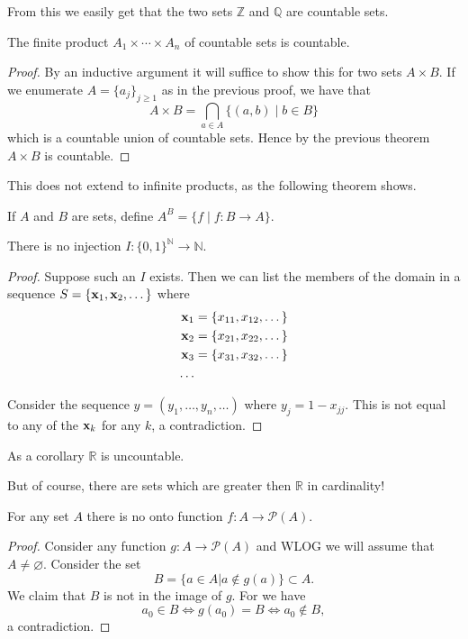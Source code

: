 From this we easily get that the two sets $\mathbb{Z}$ and $\mathbb{Q}$ are countable sets.

\begin{theorem}
The finite product $A_1 \times \cdots \times A_n$ of countable sets is countable.
\end{theorem}

\begin{proof}
By an inductive argument it will suffice to show this for two sets $A \times B$. If we enumerate $A = \{a_j\}_{j \geq 1}$ as in the previous proof, we have that 
\[A \times B = \bigcap_{a \in A}\{(a, b) \mid b \in B\}\] which is a countable union of countable sets. Hence by the previous theorem $A \times B$ is countable.
\end{proof}

This does not extend to infinite products, as the following theorem shows.
\begin{definition}
If $A$ and $B$ are sets, define $A^B = \{f \mid f:B \to A\}$.
\end{definition}
\begin{theorem}
	There is no injection $I: \{0, 1\}^{\mathbb{N}} \to \mathbb{N}$.
\end{theorem}

\begin{proof}
Suppose such an $I$ exists. Then we can list the members of the domain in a sequence $S = \{\bold{x}_1, \bold{x}_2, \dots\}$ where 
\begin{align*}
\bold{x}_1 &= \{x_{11}, x_{12}, \dots\}\\
\bold{x}_2 &= \{x_{21}, x_{22}, \dots\}\\
\bold{x}_3 &= \{x_{31}, x_{32}, \dots\}\\
	\dots
\end{align*}

Consider the sequence $y = (y_1, \dots, y_n, \dots)$ where $y_j = 1 - x_{jj}$. This is not equal to any of the $\bold{x}_k$ for any $k$, a contradiction.
\end{proof}

As a corollary $\mathbb{R}$ is uncountable.

But of course, there are sets which are greater then $\mathbb{R}$ in cardinality!

\begin{theorem}
For any set $A$ there is no onto function $f:A \to \mathcal{P}(A)$.
\end{theorem}
\begin{proof}
	Consider any function $g: A \to \mathcal{P}(A)$ and WLOG we will assume that $A \neq \varnothing$. Consider the set 
	\[B = \{a \in A | a \not\in g(a)\} \subset A.\]
	We claim that $B$ is not in the image of $g$. For we have
	\[a_0 \in B \iff g(a_0) = B \iff a_0 \not\in B,\]
	a contradiction.
\end{proof}


